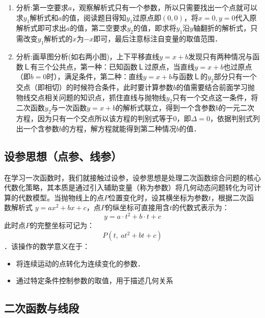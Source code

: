 \begin{minipage}{1\linewidth}
\begin{example}
    \end{example}

    \begin{solution}
    \begin{enumerate}
    \item 分析:第一空要求\(a\)，观察解析式只有一个参数，所以只需要找出一个点就可以求\(y_1\)解析式和\(a\)的值，阅读题目得知\(y_1\)过原点即\((0,0)\)，将\(x=0,y=0\)代入原解析式即可求出\(a\)的值，第二空要求\(y_2\)的值，即求将\(y_1\)沿\(y\)轴翻折的解析式，只需改变\(y_1\)解析式的\(x\)为\(-x\)即可，最后注意标注自变量的取值范围．
    \item 分析:画草图分析(如右两小图)，上下平移直线\(y=x+b\)发现只有两种情况与函数Ｌ有三个公共点，第一种：已知函数Ｌ过原点，当直线\(y=x+b\)也过原点（即\(b=0\)时），满足条件，第二种：直线\(y=x+b\)与函数Ｌ的\(y_2\)部分只有一个交点（即相切）的时候符合条件，此时要计算参数\(b\)的值需要结合前面学习抛物线交点相关问题的知识点，抓住直线与抛物线\(y_2\)只有一个交点这一条件，将二次函数\(y_2\)与一次函数\(y=x+b\)的解析式联立，得到一个含参数\(b\)的一元二次方程，因为只有一个交点所以该方程的判别式等于0，即\(\Delta=0\)，依据判别式列出一个含参数\(b\)的方程，解方程就能得到第二种情况\(b\)的值．
    \end{enumerate}
    \end{solution}

\end{minipage}






\subsection{设参思想（点参、线参）}

在学习一次函数时，我们就接触过设参，设参思想是处理二次函数综合问题的核心代数化策略，其本质是通过引入辅助变量（称为参数）将几何动态问题转化为可计算的代数模型。当抛物线上的点$P$位置变化时，设其横坐标为参数$t$，根据二次函数解析式 $y = ax^2 + bx + c$，点$P$的纵坐标可直接用含$t$的代数式表示为：
\[
y = a \cdot t^2 + b \cdot t + c
\]
此时点$P$的完整坐标可记为：
\[
P(t,\  at^2 + bt + c)
\]．该操作的数学意义在于：
\begin{itemize}
    \item 将连续运动的点转化为连续变化的参数．
    \item 通过特定条件控制参数的取值，用于描述几何关系
\end{itemize}

\subsection{二次函数与\textbf{线段}}

